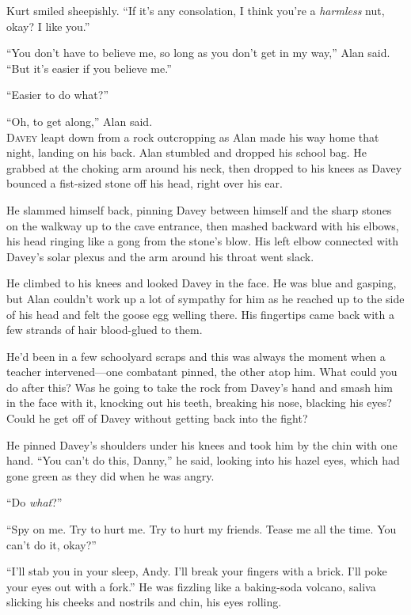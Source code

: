 \documentclass{article}
\begin{document}
Kurt smiled sheepishly.  ``If it's any consolation, I think you're a
\textit{harmless} nut, okay?  I like you.''

``You don't have to believe me, so long as you don't get in my way,''
Alan said.  ``But it's easier if you believe me.''

``Easier to do what?''

``Oh, to get along,'' Alan said.
\\
\lettrine[lines=3, lhang=.5, nindent=0pt, findent=2pt]{D}{avey} leapt down from a rock outcropping as Alan made his way home
that night, landing on his back.  Alan stumbled and dropped his school
bag.  He grabbed at the choking arm around his neck, then dropped to
his knees as Davey bounced a fist-sized stone off his head, right over
his ear.

He slammed himself back, pinning Davey between himself and the sharp
stones on the walkway up to the cave entrance, then mashed backward
with his elbows, his head ringing like a gong from the stone's blow. 
His left elbow connected with Davey's solar plexus and the arm around
his throat went slack.

He climbed to his knees and looked Davey in the face.  He was blue and
gasping, but Alan couldn't work up a lot of sympathy for him as he
reached up to the side of his head and felt the goose egg welling
there.  His fingertips came back with a few strands of hair
blood-glued to them.

He'd been in a few schoolyard scraps and this was always the moment
when a teacher intervened---one combatant pinned, the other atop him. 
What could you do after this?  Was he going to take the rock from
Davey's hand and smash him in the face with it, knocking out his
teeth, breaking his nose, blacking his eyes?  Could he get off of
Davey without getting back into the fight?

He pinned Davey's shoulders under his knees and took him by the chin
with one hand.  ``You can't do this, Danny,'' he said, looking into
his hazel eyes, which had gone green as they did when he was angry.

``Do \textit{what}?''

``Spy on me.  Try to hurt me.  Try to hurt my friends.  Tease me all
the time.  You can't do it, okay?''

``I'll stab you in your sleep, Andy.  I'll break your fingers with a
brick.  I'll poke your eyes out with a fork.'' He was fizzling like a
baking-soda volcano, saliva slicking his cheeks and nostrils and chin,
his eyes rolling.
\end{document}
